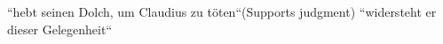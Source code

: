 \documentclass{article}
\begin{document}
``hebt seinen Dolch, um Claudius zu töten``(Supports judgment)
``widersteht er dieser Gelegenheit``















\nocite{*}

\maketitle


\end{document}

